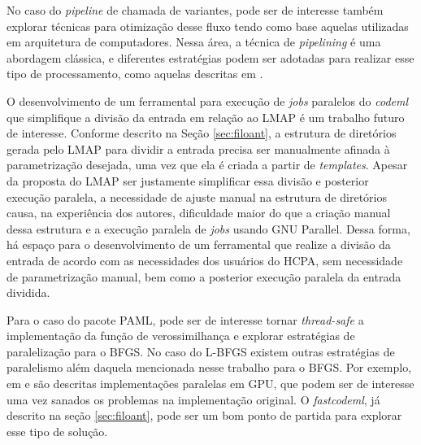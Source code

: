 \documentclass[cic,tc]{iiufrgs}
\begin{document}
No caso do \textit{pipeline} de chamada de variantes, pode ser de interesse
também explorar técnicas para otimização desse fluxo tendo como base aquelas
utilizadas em arquitetura de computadores. Nessa área, a técnica de
\textit{pipelining} é uma abordagem clássica, e diferentes estratégias podem
ser adotadas para realizar esse tipo de processamento, como aquelas descritas
em \cite{ramamoorthy1977pipeline}.

O desenvolvimento de um ferramental para execução de \textit{jobs} paralelos do
\textit{codeml} que simplifique a divisão da entrada em relação ao LMAP é um trabalho
futuro de interesse. Conforme descrito na Seção \ref{sec:filoant}, a estrutura
de diretórios gerada pelo LMAP para dividir a entrada precisa ser manualmente
afinada à parametrização desejada, uma vez que ela é criada a partir de
\textit{templates}. Apesar da proposta do LMAP ser justamente simplificar essa
divisão e posterior execução paralela, a necessidade de ajuste manual na
estrutura de diretórios causa, na experiência dos autores, dificuldade maior do
que a criação manual dessa estrutura e a execução paralela de \textit{jobs} usando GNU
Parallel. Dessa forma, há espaço para o desenvolvimento de um ferramental que
realize a divisão da entrada de acordo com as necessidades dos usuários do
HCPA, sem necessidade de parametrização manual, bem como a posterior execução
paralela da entrada dividida.

Para o caso do pacote PAML, pode ser de interesse tornar \textit{thread-safe} a
implementação da função de verossimilhança e explorar estratégias de
paralelização para o BFGS. No caso do L-BFGS existem outras estratégias de
paralelismo além daquela mencionada nesse trabalho para o BFGS. Por exemplo, em
\cite{fei2014parallel} e \cite{sanseverino2014cuda} são descritas
implementações paralelas em GPU, que podem ser de interesse uma vez sanados os
problemas na implementação original. O \textit{fastcodeml}, já descrito na seção
\ref{sec:filoant}, pode ser um bom ponto de partida para explorar esse tipo de
solução.

%
%
%
%



\end{document}
